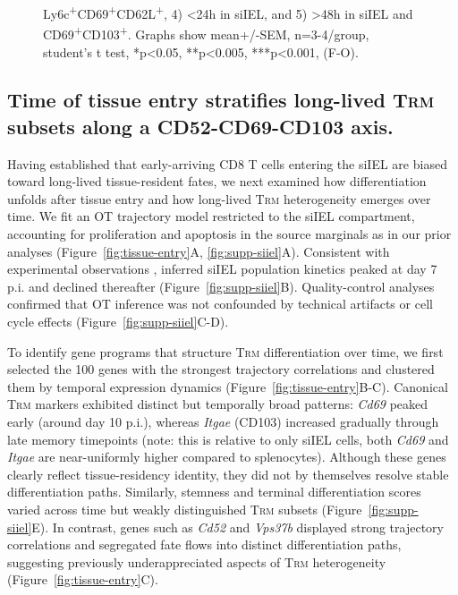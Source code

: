 \begin{figure}[p]
{Ly6c\textsuperscript{+}CD69\textsuperscript{+}CD62L\textsuperscript{+}, 4) \textless{}24h in siIEL, and 5) \textgreater{}48h in siIEL and CD69\textsuperscript{+}CD103\textsuperscript{+}. Graphs show mean+/-SEM, n=3-4/group, student's t test, *p\textless{}0.05, **p\textless{}0.005, ***p\textless{}0.001, (F-O).
    }
    \label{fig:migration-kinetics}
\end{figure}
\clearpage

\subsection{Time of tissue entry stratifies long-lived T\textsc{rm} subsets along a CD52-CD69-CD103 axis.}

Having established that early-arriving CD8 T cells entering the siIEL are biased toward long-lived tissue-resident fates, we next examined how differentiation unfolds after tissue entry and how long-lived T\textsc{rm} heterogeneity emerges over time. We fit an OT trajectory model restricted to the siIEL compartment, accounting for proliferation and apoptosis in the source marginals as in our prior analyses (Figure~\ref{fig:tissue-entry}A, \ref{fig:supp-siiel}A). Consistent with experimental observations \citep{milnerHeterogenousPopulationsTissueResident2020}, inferred siIEL population kinetics peaked at day 7 p.i. and declined thereafter (Figure~\ref{fig:supp-siiel}B). Quality-control analyses confirmed that OT inference was not confounded by technical artifacts or cell cycle effects (Figure~\ref{fig:supp-siiel}C-D).

To identify gene programs that structure T\textsc{rm} differentiation over time, we first selected the 100 genes with the strongest trajectory correlations and clustered them by temporal expression dynamics (Figure~\ref{fig:tissue-entry}B-C). Canonical T\textsc{rm} markers exhibited distinct but temporally broad patterns: \emph{Cd69} peaked early (around day 10 p.i.), whereas \emph{Itgae} (CD103) increased gradually through late memory timepoints (note: this is relative to only siIEL cells, both \emph{Cd69} and \emph{Itgae} are near-uniformly higher compared to splenocytes). Although these genes clearly reflect tissue-residency identity, they did not by themselves resolve stable differentiation paths. Similarly, stemness and terminal differentiation scores varied across time but weakly distinguished T\textsc{rm} subsets (Figure~\ref{fig:supp-siiel}E). In contrast, genes such as \emph{Cd52} and \emph{Vps37b} displayed strong trajectory correlations and segregated fate flows into distinct differentiation paths, suggesting previously underappreciated aspects of T\textsc{rm} heterogeneity (Figure~\ref{fig:tissue-entry}C).

